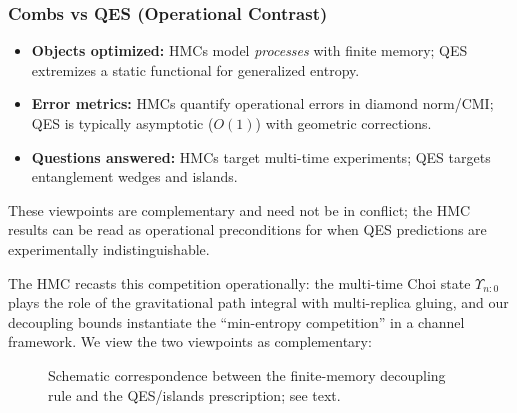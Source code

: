 \documentclass[aps,prd,preprint,onecolumn,superscriptaddress,nofootinbib,longbibliography,floatfix,11pt,showpacs,showkeys]{revtex4-2}
\newcommand{\HMC}{\textsc{HMC}\xspace}
\theoremstyle{plain}
\theoremstyle{definition}
\theoremstyle{remark}
\begin{document}
\subsubsection{Combs vs QES (Operational Contrast)}
\label{app:comb-vs-qes}
\begin{itemize}[leftmargin=*,itemsep=0.25em]
  \item \textbf{Objects optimized:} \HMC{}s model \emph{processes} with finite memory; QES extremizes a static functional for generalized entropy.
  \item \textbf{Error metrics:} \HMC{}s quantify operational errors in diamond norm/CMI; QES is typically asymptotic ($O(1)$) with geometric corrections.
  \item \textbf{Questions answered:} \HMC{}s target multi-time experiments; QES targets entanglement wedges and islands.
\end{itemize}
These viewpoints are complementary and need not be in conflict; the \HMC{} results can be read as operational preconditions for when QES predictions are experimentally indistinguishable.


The \HMC{} recasts this competition operationally:
the multi-time Choi state $\Upsilon_{n{:}0}$ plays the role of the gravitational path integral with multi-replica gluing,
and our decoupling bounds instantiate the ``min-entropy competition'' in a channel framework.
We view the two viewpoints as complementary:

\begin{figure}[t]
\centering
{}
\caption{Schematic correspondence between the finite-memory decoupling rule and the QES/islands prescription; see text.}
\label{fig:decoupling-qes}
\end{figure}
\end{document}
